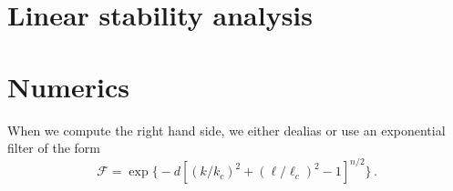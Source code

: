 \documentclass[12pt, oneside]{article}
\newcommand{\per}{\, .}
\newcommand{\beq}{\begin{equation}}
\newcommand{\eeq}{\end{equation}}
\begin{document}
\section{Linear stability analysis}

\section{Numerics}

When we compute the right hand side, we either dealias or use an exponential filter of the form
\beq
\mathscr{F} = \exp \Big \{ - d \left [ \left ( k / k_c \right )^2 + \left ( \ell / \ell_c \right )^2 - 1 \right ]^{n/2} \Big \} \per
\eeq



\end{document}
